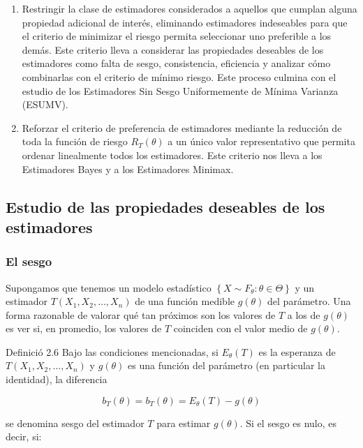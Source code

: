 \documentclass[
]{article}
\providecommand{\tightlist}{%
  \setlength{\itemsep}{0pt}\setlength{\parskip}{0pt}}
\begin{document}
\begin{enumerate}
\def\labelenumi{\arabic{enumi}.}
\tightlist
\item
  Restringir la clase de estimadores considerados a aquellos que cumplan alguna propiedad adicional de interés, eliminando estimadores indeseables para que el criterio de minimizar el riesgo permita seleccionar uno preferible a los demás. Este criterio lleva a considerar las propiedades deseables de los estimadores como falta de sesgo, consistencia, eficiencia y analizar cómo combinarlas con el criterio de mínimo riesgo. Este proceso culmina con el estudio de los Estimadores Sin Sesgo Uniformemente de Mínima Varianza (ESUMV).
\item
  Reforzar el criterio de preferencia de estimadores mediante la reducción de toda la función de riesgo \(R_{T}(\theta)\) a un único valor representativo que permita ordenar linealmente todos los estimadores. Este criterio nos lleva a los Estimadores Bayes y a los Estimadores Minimax.
\end{enumerate}

\subsection{Estudio de las propiedades deseables de los estimadores}\label{estudio-de-las-propiedades-deseables-de-los-estimadores}

\subsubsection{El sesgo}\label{el-sesgo}

Supongamos que tenemos un modelo estadístico \(\left\{X \sim F_{\theta}: \theta \in \Theta\right\}\) y un estimador \(T\left(X_{1}, X_{2}, \ldots, X_{n}\right)\) de una función medible \(g(\theta)\) del parámetro. Una forma razonable de valorar qué tan próximos son los valores de \(T\) a los de \(g(\theta)\) es ver si, en promedio, los valores de \(T\) coinciden con el valor medio de \(g(\theta)\).

Definició 2.6 Bajo las condiciones mencionadas, si \(E_{\theta}(T)\) es la esperanza de \(T\left(X_{1}, X_{2}, \ldots, X_{n}\right)\) y \(g(\theta)\) es una función del parámetro (en particular la identidad), la diferencia

\[
b_{T}(\theta)=b_{T}(\theta)=E_{\theta}(T)-g(\theta)
\]

se denomina sesgo del estimador \(T\) para estimar \(g(\theta)\). Si el sesgo es nulo, es decir, si:
\end{document}
